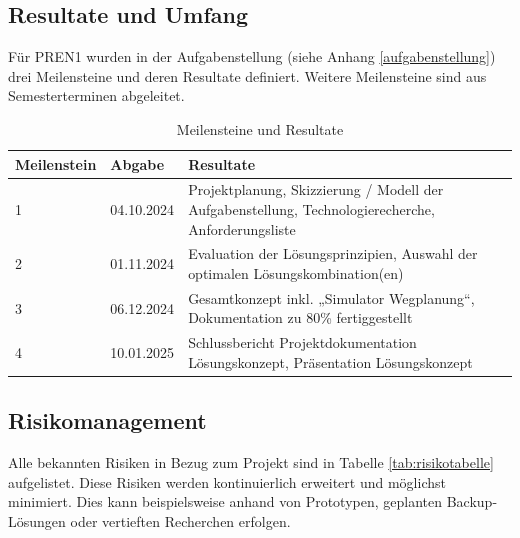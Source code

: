 \documentclass[../main.tex]{subfiles}
\begin{document}
\subsection{Resultate und Umfang}
Für PREN1 wurden in der Aufgabenstellung (siehe Anhang \ref{aufgabenstellung}) drei Meilensteine und deren Resultate definiert. Weitere Meilensteine sind aus Semesterterminen abgeleitet.
\begin{table}[H]
\centering
\begin{tabular}{|l|l|p{10cm}|}
\hline
\textbf{Meilenstein} & \textbf{Abgabe} & \textbf{Resultate} \\ \hline
 1        & 04.10.2024      & Projektplanung, Skizzierung / Modell der Aufgabenstellung, Technologierecherche, Anforderungsliste \\ \hline
 2        & 01.11.2024      & Evaluation der Lösungsprinzipien, Auswahl der optimalen Lösungskombination(en) \\ \hline
 3        & 06.12.2024      & Gesamtkonzept inkl. „Simulator Wegplanung“, Dokumentation zu 80\% fertiggestellt \\ \hline
 4        & 10.01.2025      &  Schlussbericht Projektdokumentation Lösungskonzept, Präsentation Lösungskonzept\\ \hline 
 
\end{tabular}
\caption{Meilensteine und Resultate}
\label{tab:meilensteine}
\end{table}


\subsection{Risikomanagement} \label{risikomatrix}

Alle bekannten Risiken in Bezug zum Projekt sind in Tabelle \ref{tab:risikotabelle} aufgelistet. Diese Risiken werden kontinuierlich erweitert und möglichst minimiert. Dies kann beispielsweise anhand von Prototypen, geplanten Backup-Lösungen oder vertieften Recherchen erfolgen.
\end{document}

